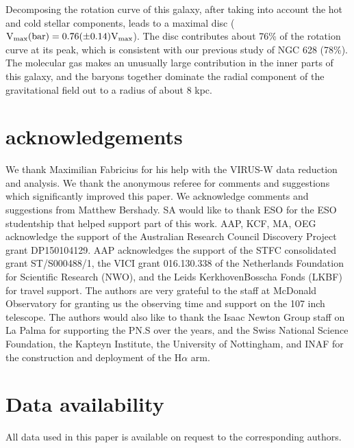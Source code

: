 \documentclass[fleqn,usenatbib]{mnras}
\begin{document}
Decomposing the rotation curve of this galaxy, after taking into account the hot and cold stellar components, leads to a maximal disc ($\rm V_{max}(bar)=0.76(\pm 0.14)V_{max}$). The disc contributes about 76\% of the rotation curve at its peak, which is consistent with our previous study of NGC 628 (78\%). The molecular gas makes an unusually large contribution in the inner parts of this galaxy, and the baryons together dominate the radial component of the gravitational field out to a radius of about 8 kpc.
 
\section*{acknowledgements}
We thank Maximilian Fabricius for his help with the VIRUS-W
data reduction and analysis. We thank the 
anonymous referee for comments and suggestions which significantly 
improved this paper. We acknowledge comments and suggestions from Matthew Bershady.
SA would like to thank ESO for the ESO studentship that helped
support part of this work. AAP, KCF, MA, OEG acknowledge the support
of the Australian Research Council Discovery Project grant
DP150104129. AAP acknowledges the support of the STFC consolidated grant
ST/S000488/1, the VICI grant 016.130.338 
of the Netherlands Foundation for Scientific Research (NWO), 
and the Leids KerkhovenBosscha Fonds (LKBF) for travel support. 
The authors are very grateful to the staff at McDonald
Observatory for granting us the observing time and support on the 107
inch telescope. The authors would also like to thank the Isaac Newton
Group staff on La Palma for supporting the PN.S over the years, and
the Swiss National Science Foundation, the Kapteyn Institute, the
University of Nottingham, and INAF for the construction and deployment
of the H$\alpha$ arm. 

\section*{Data availability}
All data used in this paper is available on request to the corresponding authors. 




\vspace*{1cm}
\end{document}
